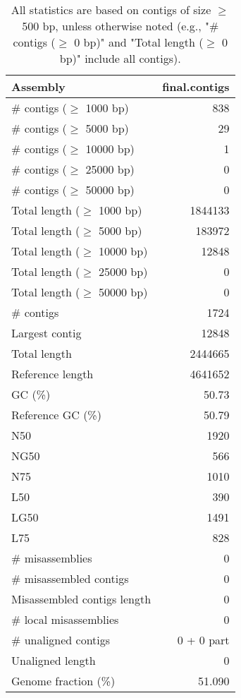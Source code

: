 \documentclass[12pt,a4paper]{article}
\begin{document}
\begin{table}[ht]
\begin{center}
\caption{All statistics are based on contigs of size $\geq$ 500 bp, unless otherwise noted (e.g., "\# contigs ($\geq$ 0 bp)" and "Total length ($\geq$ 0 bp)" include all contigs).}
\begin{tabular}{|l*{1}{|r}|}
\hline
Assembly & final.contigs \\ \hline
\# contigs ($\geq$ 1000 bp) & 838 \\ \hline
\# contigs ($\geq$ 5000 bp) & 29 \\ \hline
\# contigs ($\geq$ 10000 bp) & 1 \\ \hline
\# contigs ($\geq$ 25000 bp) & 0 \\ \hline
\# contigs ($\geq$ 50000 bp) & 0 \\ \hline
Total length ($\geq$ 1000 bp) & 1844133 \\ \hline
Total length ($\geq$ 5000 bp) & 183972 \\ \hline
Total length ($\geq$ 10000 bp) & 12848 \\ \hline
Total length ($\geq$ 25000 bp) & 0 \\ \hline
Total length ($\geq$ 50000 bp) & 0 \\ \hline
\# contigs & 1724 \\ \hline
Largest contig & 12848 \\ \hline
Total length & 2444665 \\ \hline
Reference length & 4641652 \\ \hline
GC (\%) & 50.73 \\ \hline
Reference GC (\%) & 50.79 \\ \hline
N50 & 1920 \\ \hline
NG50 & 566 \\ \hline
N75 & 1010 \\ \hline
L50 & 390 \\ \hline
LG50 & 1491 \\ \hline
L75 & 828 \\ \hline
\# misassemblies & 0 \\ \hline
\# misassembled contigs & 0 \\ \hline
Misassembled contigs length & 0 \\ \hline
\# local misassemblies & 0 \\ \hline
\# unaligned contigs & 0 + 0 part \\ \hline
Unaligned length & 0 \\ \hline
Genome fraction (\%) & 51.090 \\ \hline

\end{tabular}
\end{center}
\end{table}
\end{document}
